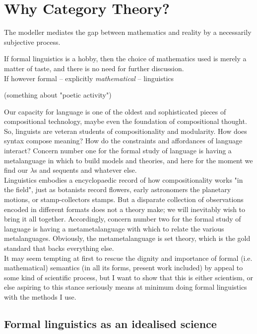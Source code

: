 \section{Why Category Theory?}

The modeller mediates the gap between mathematics and reality by a necessarily subjective process.

If formal linguistics is a hobby, then the choice of mathematics used is merely a matter of taste, and there is no need for further discussion.\\

If however formal -- explicitly \emph{mathematical} -- linguistics 

(something about "poetic activity")

Our capacity for language is one of the oldest and sophisticated pieces of compositional technology, maybe even the foundation of compositional thought. So, linguists are veteran students of compositionality and modularity. How does syntax compose meaning? How do the constraints and affordances of language interact? Concern number one for the formal study of language is having a metalanguage in which to build models and theories, and here for the moment we find our $\lambda$s and sequents and whatever else.\\

Linguistics embodies a encyclopaedic record of how compositionality works "in the field", just as botanists record flowers, early astronomers the planetary motions, or stamp-collectors stamps. But a disparate collection of observations encoded in different formats does not a theory make; we will inevitably wish to bring it all together. Accordingly, concern number two for the formal study of language is having a metametalanguage with which to relate the various metalanguages. Obviously, the metametalanguage is set theory, which is the gold standard that backs everything else.\\

It may seem tempting at first to rescue the dignity and importance of formal (i.e. mathematical) semantics (in all its forms, present work included) by appeal to some kind of scientific process, but I want to show that this is either scientism, or else aspiring to this stance seriously means at minimum doing formal linguistics with the methods I use.



\subsection{Formal linguistics as an idealised science}

